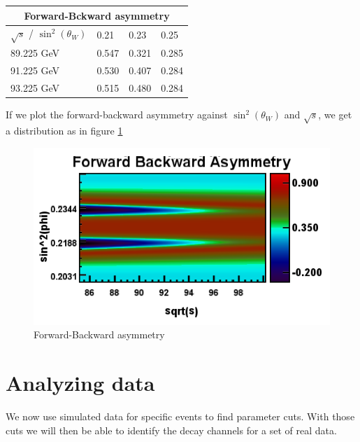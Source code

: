\documentclass[]{article}
\begin{document}
\begin{tabular}{ |p{3cm}||p{2cm}|p{2cm}|p{2cm}|  }
 \hline
 \multicolumn{4}{|c|}{Forward-Bckward asymmetry} \\
 \hline
 $\sqrt{s}$ / $\sin^2(\theta_W)$ & 0.21 & 0.23 & 0.25 \\
 \hline
   89.225 GeV & 0.547 & 0.321 & 0.285  \\
   91.225 GeV & 0.530 & 0.407 & 0.284  \\
   93.225 GeV & 0.515 & 0.480 & 0.284  \\
  \hline
\end{tabular}

If we plot the forward-backward asymmetry against $\sin^2(\theta_W)$ and $\sqrt{s}$, we get a distribution as in figure \ref{fig:for-back-asy}
\begin{figure}[H]
	\centering
	\includegraphics[scale=0.6]{forward_backward_symmetry}
	\caption{Forward-Backward asymmetry}
	\label{fig:for-back-asy}
\end{figure}

\section{Analyzing data}
We now use simulated data for specific events to find parameter cuts. With those cuts we will then be able to identify the decay channels for a set of real data.
\end{document}
